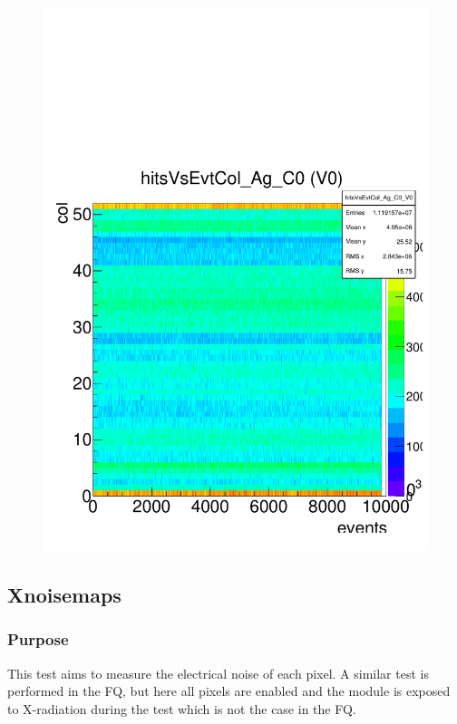 \documentclass[a4paper,12pt,twoside]{article}
\begin{document}
\begin{figure} [h!]
\begin{minipage}{.48\textwidth}
  \includegraphics[width=\textwidth]{./Figures/HRData_HitsEventColumn.pdf}
  \label{HRData-HitsEventColumn}
\end{minipage}
\end{figure}


\subsection{Xnoisemaps}
\subsubsection{Purpose}
This test aims to measure the electrical noise of each pixel. A similar test is performed in the FQ, but here all pixels are enabled and the module is exposed to X-radiation during the test which is not the case in the FQ.
\end{document}
